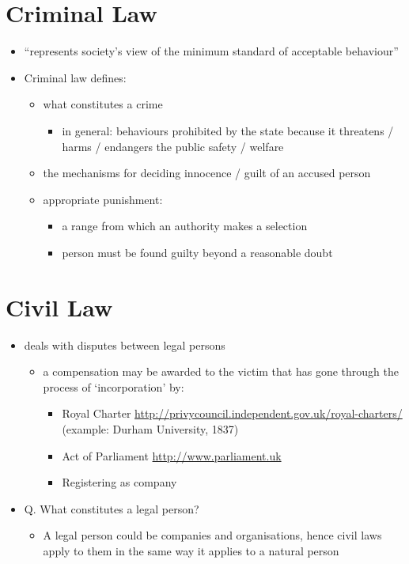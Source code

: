 \documentclass{article}
\begin{document}
\section{Criminal Law}
\begin{itemize}
\item ``represents society's view of the minimum standard of acceptable behaviour'' \cite{shears_james_2005}

\item Criminal law defines:
\begin{itemize}
\item what constitutes a crime
\begin{itemize}
\item in general: behaviours prohibited by the state because it threatens / harms / endangers the public safety / welfare
\end{itemize}
\item the mechanisms for deciding innocence / guilt of an accused person
\item appropriate punishment:
\begin{itemize}
\item a range from which an authority makes a selection 
\item person must be found guilty beyond a reasonable doubt
\end{itemize}
\end{itemize}
\end{itemize}




\section{Civil Law}
\begin{itemize}
\item deals with disputes between legal persons
\begin{itemize}
\item a compensation may be awarded to the victim that has gone through the process of `incorporation' by:
\begin{itemize}
\item Royal Charter \url{http://privycouncil.independent.gov.uk/royal-charters/}
(example: Durham University, 1837)
\item Act of Parliament \url{http://www.parliament.uk}
\item Registering as company 
\end{itemize}
\end{itemize}

\item Q. What constitutes a legal person?

\begin{itemize}
\item A legal person could be companies and organisations, hence civil laws apply to them in the same way it applies to a natural person
\end{itemize}
\end{itemize}
\end{document}
